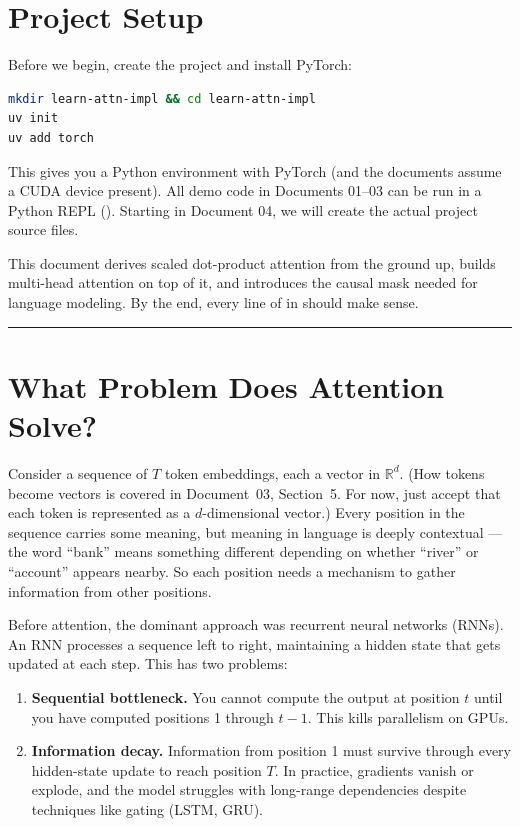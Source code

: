 


\section{Project Setup}

Before we begin, create the project and install PyTorch:

\shelltag
\begin{lstlisting}[language=bash]
mkdir learn-attn-impl && cd learn-attn-impl
uv init
uv add torch
\end{lstlisting}

This gives you a Python environment with PyTorch (and the documents assume a CUDA device present). All demo code in Documents 01--03 can be run in a Python REPL (). Starting in Document 04, we will create the actual project source files.


This document derives scaled dot-product attention from the ground up, builds multi-head attention on top of it, and introduces the causal mask needed for language modeling. By the end, every line of  in  should make sense.

\bigskip\hrule\bigskip

\section{What Problem Does Attention Solve?}

Consider a sequence of $T$ token embeddings, each a vector in $\mathbb{R}^d$. (How tokens become vectors is covered in Document~03, Section~5. For now, just accept that each token is represented as a $d$-dimensional vector.) Every position in the sequence carries some meaning, but meaning in language is deeply contextual --- the word ``bank'' means something different depending on whether ``river'' or ``account'' appears nearby. So each position needs a mechanism to gather information from other positions.

Before attention, the dominant approach was recurrent neural networks (RNNs). An RNN processes a sequence left to right, maintaining a hidden state that gets updated at each step. This has two problems:

\begin{enumerate}
  \item \textbf{Sequential bottleneck.} You cannot compute the output at position $t$ until you have computed positions 1 through $t-1$. This kills parallelism on GPUs.
  \item \textbf{Information decay.} Information from position 1 must survive through every hidden-state update to reach position $T$. In practice, gradients vanish or explode, and the model struggles with long-range dependencies despite techniques like gating (LSTM, GRU).
\end{enumerate}

